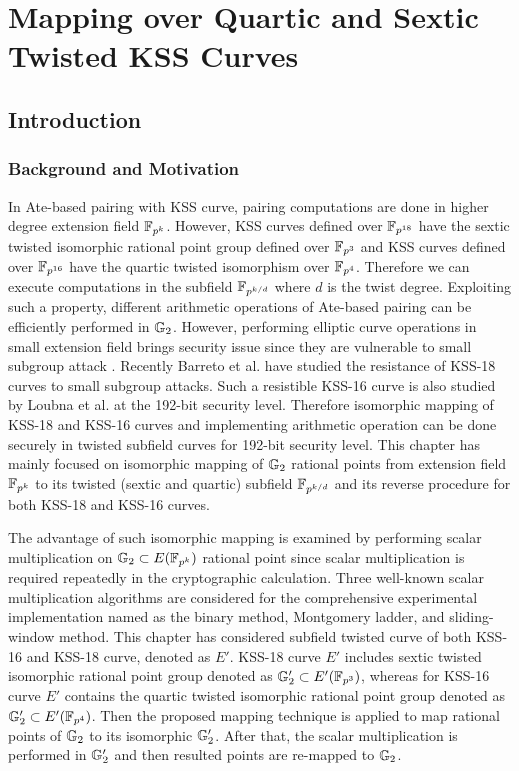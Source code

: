 \chapter{Mapping over Quartic and Sextic Twisted KSS Curves}
\label{ch:ijnc2017}
\section{Introduction}
\subsection{Background and Motivation}
In Ate-based pairing with KSS curve,  pairing computations are done in higher degree extension field $\mathbb{F}_{p^k}$.
However, KSS curves defined over $\mathbb{F}_{p^{18}}$ have the sextic twisted isomorphic rational point group defined over $\mathbb{F}_{p^3}$ and KSS curves defined over $\mathbb{F}_{p^{16}}$ have the quartic twisted isomorphism over $\mathbb{F}_{p^4}$. 
Therefore we can execute computations in the subfield $\mathbb{F}_{p^{k/d}}$ where $d$ is the twist degree. 
Exploiting such a property, different arithmetic operations of Ate-based pairing can be efficiently performed in ${\mathbb{G}}_{2}$.  
However, performing elliptic curve operations in small extension field brings security issue since they are vulnerable to small subgroup attack \cite{C:LimLee97}. 
Recently Barreto et al. \cite{LC:BCMNPZ15} have studied the resistance of  KSS-18 curves to small subgroup attacks. 
Such a resistible KSS-16 curve is also studied by Loubna et al. \cite{EPRINT:GhaFou16b} at the 192-bit security level. 
Therefore isomorphic mapping of KSS-18 and KSS-16 curves and implementing arithmetic operation can be done securely in twisted subfield curves for 192-bit security level.
This chapter has mainly focused on isomorphic mapping of ${\mathbb{G}}_{2}$ rational points from extension field $\mathbb{F}_{p^k}$ to its twisted (sextic and quartic) subfield $\mathbb{F}_{p^{k/d}}$ and its reverse procedure for both KSS-18 and KSS-16 curves. 

The advantage of such isomorphic mapping is examined by performing scalar multiplication on ${\mathbb{G}}_{2} \subset E(\mathbb{F}_{p^k})$ rational point since scalar multiplication is required repeatedly in the cryptographic calculation. 
Three well-known scalar multiplication algorithms are considered for the comprehensive experimental implementation named as the binary method, Montgomery ladder, and sliding-window method.
This chapter has considered subfield twisted curve of both  KSS-16 and KSS-18 curve, denoted as $E'$. 
KSS-18 curve $E'$ includes sextic twisted isomorphic rational point group denoted as ${\mathbb{G}}_{2}' \subset E'(\mathbb{F}_{p^3})$, whereas  for KSS-16 curve $E'$ contains the quartic twisted  isomorphic rational point group denoted as ${\mathbb{G}}_{2}' \subset E'(\mathbb{F}_{p^4})$.
Then the proposed mapping technique is applied to map rational points of ${\mathbb{G}}_{2}$ to its isomorphic ${\mathbb{G}}_{2}'$. 
After that, the scalar multiplication is performed in ${\mathbb{G}}_{2}'$ and then resulted points are re-mapped to ${\mathbb{G}}_{2}$.

